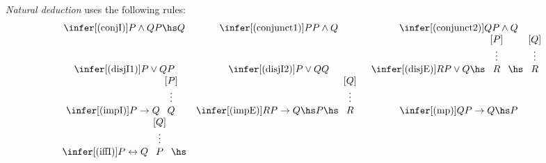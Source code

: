 \documentclass{article}
\begin{document}
\begin{definition}
    \emph{Natural deduction} uses the following rules:
    \begin{align*}
        \begin{array}{c c c}
            \infer[(\text{conjI})]{P\wedge Q}{P\hs Q}                                                          &
            \infer[(\text{conjunct1})]{P}{P\wedge Q}                                                           &
            \infer[(\text{conjunct2})]{Q}{P\wedge Q}                                                             \\
            \infer[(\text{disjI1})]{P\vee Q}{P}                                                                &
            \infer[(\text{disjI2})]{P\vee Q}{Q}                                                                &
            \infer[(\text{disjE})]{R}{P\vee Q \hs \begin{array}[b]{c}
                    [P] \\ \vdots \\ R
                \end{array}
            \hs \begin{array}[b]{c}
                    [Q] \\ \vdots \\ R
                \end{array}}                                                                      \\
            \infer[(\text{impI})]{P\to Q}{\begin{array}[b]{c}
                    [P] \\\vdots\\Q
                \end{array}}                                          &
            \infer[(\text{impE})]{R}{P\to Q\hs P \hs \begin{array}[b]{c}
                    [Q] \\\vdots\\R
                \end{array}}                               &
            \infer[(\text{mp})]{Q}{P\to Q\hs P}                                                                  \\
            \infer[(\text{iffI})]{P\leftrightarrow Q}{\begin{array}[b]{c}
                    [Q] \\\vdots\\P
                \end{array}\hs\begin{array}[b]{c}

\end{array}}
\end{array}
\end{align*}
\end{definition}
\end{document}
